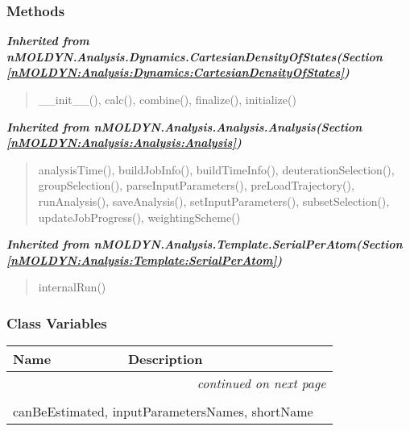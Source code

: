 
  \subsubsection{Methods}


\large{\textbf{\textit{Inherited from nMOLDYN.Analysis.Dynamics.CartesianDensityOfStates\textit{(Section \ref{nMOLDYN:Analysis:Dynamics:CartesianDensityOfStates})}}}}

\begin{quote}
\_\_init\_\_(), calc(), combine(), finalize(), initialize()
\end{quote}

\large{\textbf{\textit{Inherited from nMOLDYN.Analysis.Analysis.Analysis\textit{(Section \ref{nMOLDYN:Analysis:Analysis:Analysis})}}}}

\begin{quote}
analysisTime(), buildJobInfo(), buildTimeInfo(), deuterationSelection(), groupSelection(), parseInputParameters(), preLoadTrajectory(), runAnalysis(), saveAnalysis(), setInputParameters(), subsetSelection(), updateJobProgress(), weightingScheme()
\end{quote}

\large{\textbf{\textit{Inherited from nMOLDYN.Analysis.Template.SerialPerAtom\textit{(Section \ref{nMOLDYN:Analysis:Template:SerialPerAtom})}}}}

\begin{quote}
internalRun()
\end{quote}


  \subsubsection{Class Variables}

    \vspace{-1cm}
\hspace{\varindent}\begin{longtable}{|p{\varnamewidth}|p{\vardescrwidth}|l}
\cline{1-2}
\cline{1-2} \centering \textbf{Name} & \centering \textbf{Description}& \\
\cline{1-2}
\endhead\cline{1-2}\multicolumn{3}{r}{\small\textit{continued on next page}}\\\endfoot\cline{1-2}
\endlastfoot\multicolumn{2}{|l|}{\textit{Inherited from nMOLDYN.Analysis.Dynamics.CartesianDensityOfStates \textit{(Section \ref{nMOLDYN:Analysis:Dynamics:CartesianDensityOfStates})}}}\\
\multicolumn{2}{|p{\varwidth}|}{\raggedright canBeEstimated, inputParametersNames, shortName}\\
\cline{1-2}
\end{longtable}

